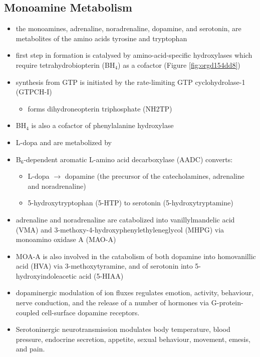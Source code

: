 \documentclass{scrartcl}
\begin{document}
\subsection{Monoamine Metabolism}
\label{sec:org243bf79}
\begin{itemize}
\item the monoamines, adrenaline, noradrenaline, dopamine, and serotonin,
are metabolites of the amino acids tyrosine and tryptophan
\item first step in formation is catalysed by amino-acid-specific
hydroxylases which require tetrahydrobiopterin (BH\(_{\text{4}}\)) as a cofactor
(Figure \ref{fig:orgd154dd8})
\item synthesis from GTP is initiated by the rate-limiting GTP
cyclohydrolase-1 (GTPCH-I)
\begin{itemize}
\item forms dihydroneopterin triphosphate (NH2TP)
\end{itemize}
\item BH\(_{\text{4}}\) is also a cofactor of phenylalanine hydroxylase
\item L-dopa and  are metabolized by
\item B\(_{\text{6}}\)-dependent aromatic L-amino acid decarboxylase (AADC) converts:
\begin{itemize}
\item L-dopa \(\to\) dopamine (the precursor of the catecholamines, adrenaline and
noradrenaline)
\item 5-hydroxytryptophan (5-HTP) to serotonin (5-hydroxytryptamine)
\end{itemize}
\item adrenaline and noradrenaline are catabolized into vanillylmandelic
acid (VMA) and 3-methoxy-4-hydroxyphenylethyleneglycol (MHPG) via
monoamino oxidase A (MAO-A)
\item MOA-A is also involved in the catabolism of both dopamine into
homovanillic acid (HVA) via 3-methoxytyramine, and of serotonin into
5-hydroxyindoleacetic acid (5-HIAA)
\item dopaminergic modulation of ion fluxes regulates emotion, activity,
behaviour, nerve conduction, and the release of a number of hormones
via G-protein-coupled cell-surface dopamine
receptors.
\item Serotoninergic neurotransmission modulates body temperature, blood
pressure, endocrine secretion, appetite, sexual behaviour, movement,
emesis, and pain.
\end{itemize}
\end{document}
